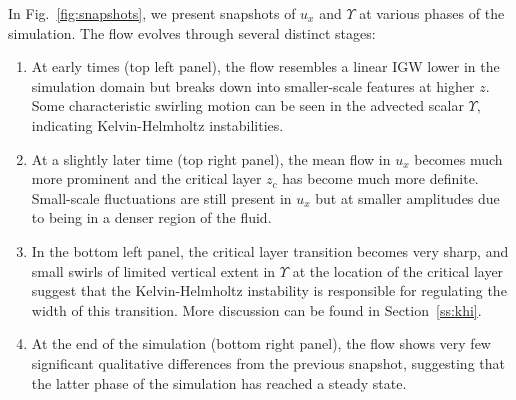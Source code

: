 \documentclass[
        fleqn,
        usenatbib,
        referee,
    ]{mnras}
\begin{document}
In Fig.~\ref{fig:snapshots}, we present snapshots of $u_x$ and $\Upsilon$ at
various phases of the simulation. The flow evolves through several distinct
stages:
\begin{enumerate}
    \item At early times (top left panel), the flow resembles a linear IGW lower
        in the simulation domain but breaks down into smaller-scale features at
        higher $z$. Some characteristic swirling motion can be seen in the
        advected scalar $\Upsilon$, indicating Kelvin-Helmholtz instabilities.

    \item At a slightly later time (top right panel), the mean flow in
        $u_x$ becomes much more prominent and the critical layer $z_c$ has
        become much more definite. Small-scale fluctuations are still present in
        $u_x$ but at smaller amplitudes due to being in a denser region of the
        fluid.

    \item In the bottom left panel, the critical layer transition becomes very
        sharp, and small swirls of limited vertical extent in $\Upsilon$ at the
        location of the critical layer suggest that the Kelvin-Helmholtz
        instability is responsible for regulating the width of this transition.
        More discussion can be found in Section~\ref{ss:khi}.

    \item At the end of the simulation (bottom right panel), the flow shows very
        few significant qualitative differences from the previous snapshot,
        suggesting that the latter phase of the simulation has reached a steady
        state.
\end{enumerate}
\end{document}
